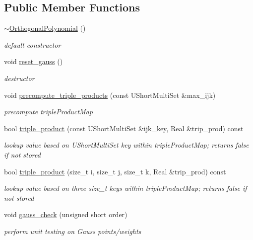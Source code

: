 \subsection*{Public Member Functions}
\begin{DoxyCompactItemize}
\item 
\hyperlink{classPecos_1_1OrthogonalPolynomial_a0547c9de695c718852fbac1852550226}{$\sim$\+Orthogonal\+Polynomial} ()\label{classPecos_1_1OrthogonalPolynomial_a0547c9de695c718852fbac1852550226}

\begin{DoxyCompactList}\small\item\em default constructor \end{DoxyCompactList}\item 
void \hyperlink{classPecos_1_1OrthogonalPolynomial_ad6115367af3811a5c75acbe340f04e58}{reset\+\_\+gauss} ()
\begin{DoxyCompactList}\small\item\em destructor \end{DoxyCompactList}\item 
void \hyperlink{classPecos_1_1OrthogonalPolynomial_ae0a12f67636f1a11987ed07e52d894b4}{precompute\+\_\+triple\+\_\+products} (const U\+Short\+Multi\+Set \&max\+\_\+ijk)
\begin{DoxyCompactList}\small\item\em precompute triple\+Product\+Map \end{DoxyCompactList}\item 
bool \hyperlink{classPecos_1_1OrthogonalPolynomial_ac922291ee984b86b16e4eba2109d7f03}{triple\+\_\+product} (const U\+Short\+Multi\+Set \&ijk\+\_\+key, Real \&trip\+\_\+prod) const \label{classPecos_1_1OrthogonalPolynomial_ac922291ee984b86b16e4eba2109d7f03}

\begin{DoxyCompactList}\small\item\em lookup value based on U\+Short\+Multi\+Set key within triple\+Product\+Map; returns false if not stored \end{DoxyCompactList}\item 
bool \hyperlink{classPecos_1_1OrthogonalPolynomial_acdf9ef648b8655a19be44b125e87a92f}{triple\+\_\+product} (size\+\_\+t i, size\+\_\+t j, size\+\_\+t k, Real \&trip\+\_\+prod) const \label{classPecos_1_1OrthogonalPolynomial_acdf9ef648b8655a19be44b125e87a92f}

\begin{DoxyCompactList}\small\item\em lookup value based on three size\+\_\+t keys within triple\+Product\+Map; returns false if not stored \end{DoxyCompactList}\item 
void \hyperlink{classPecos_1_1OrthogonalPolynomial_acef82563bd01f76a8c564664840de3fa}{gauss\+\_\+check} (unsigned short order)\label{classPecos_1_1OrthogonalPolynomial_acef82563bd01f76a8c564664840de3fa}

\begin{DoxyCompactList}\small\item\em perform unit testing on Gauss points/weights \end{DoxyCompactList}\end{DoxyCompactItemize}
